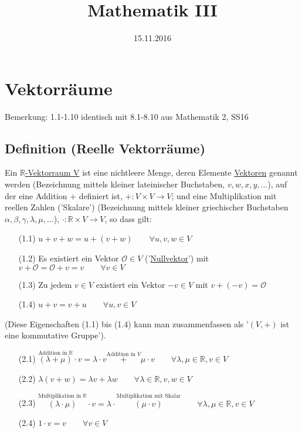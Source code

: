 \documentclass[12pt,titlepage, pdf]{article}
\title{Mathematik III}
\date{15.11.2016}
\newcommand{\R}{\mathds{R}}
\renewcommand{\>}{\rightarrow}
\renewcommand{\*}{\cdot}
\renewcommand{\O}{\mathcal{O}}
\begin{document}
	\maketitle
	\tableofcontents
	\newpage
	\section{Vektorräume}
	\small{Bemerkung: 1.1-1.10 identisch mit 8.1-8.10 aus Mathematik 2, SS16}
	\subsection{Definition (Reelle Vektorräume)}
	Ein \underline{$\R$-Vektorraum V} ist eine nichtleere Menge, deren Elemente \underline{Vektoren} genannt werden (Bezeichnung mittels kleiner lateinischer Buchstaben, $v,w,x,y,...$), auf der eine Addition $+$ definiert ist, $+\colon V\times V\>V$; und eine Multiplikation mit reellen Zahlen ('Skalare') (Bezeichnung mittels kleiner griechischer Buchstaben $\alpha, \beta, \gamma, \lambda,\mu,...$), $\*\colon\R\times V\>V$, so dass gilt:
	\begin{itemize}
		\item[(1.1)] $u+v+w=u+(v+w)\qquad\forall u,v,w\in V$
	   	\item[(1.2)] Es existiert ein Vektor $\O\in V$ ('\underline{Nullvektor}') mit $v+\O=\O+v=v\qquad\forall v\in V$
	   	\item[(1.3)] Zu jedem $v\in V$ existiert ein Vektor $-v\in V$ mit $v+(-v)=\O$
		\item[(1.4)] $u+v=v+u\qquad\forall u,v\in V$
	\end{itemize}
	(Diese Eigenschaften (1.1) bis (1.4) kann man zusammenfassen als '$(V,+)$ ist eine kommutative Gruppe').
	\begin{itemize}
		\item[(2.1)] $\overset{\textrm{Addition in }\R}{(\lambda+\mu)}\*v=\lambda\*v\overset{\textrm{Addition in }V}{+}\mu\*v\qquad\forall\lambda,\mu\in\R,v\in V$
		\item[(2.2)] $\lambda(v+w)=\lambda v+\lambda w\qquad\forall\lambda\in\R,v,w\in V$
		\item[(2.3)] $\overset{\textrm{Multiplikation in }\R}{(\lambda\*\mu)}\*v=\lambda\*\overset{\textrm{Multiplikation mit Skalar}}{(\mu\*v)}\qquad\forall\lambda,\mu\in\R,v\in V$
		\item[(2.4)] $1\*v=v\qquad\forall v\in V$
	\end{itemize}
\end{document}
